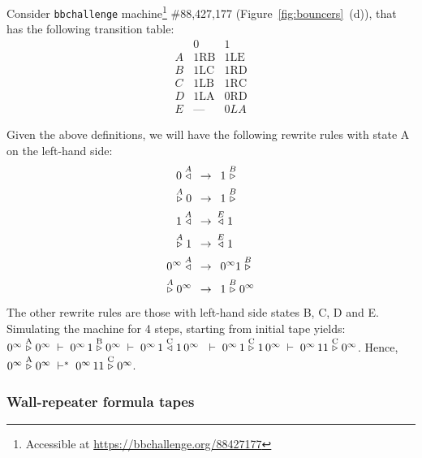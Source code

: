 \begin{example}\label{ex:bouncer88427177}
    Consider \texttt{bbchallenge} machine\footnote{Accessible at \url{https://bbchallenge.org/88427177}} \#88,427,177 (Figure~\ref{fig:bouncers}~(d)), that has the following transition table:
    \[
        \begin{array}{l|ll}
              & 0          & 1          \\
            \hline
            A & 1\text{RB} & 1\text{LE} \\
            B & 1\text{LC} & 1\text{RD} \\
            C & 1\text{LB} & 1\text{RC} \\
            D & 1\text{LA} & 0\text{RD} \\
            E & \mbox{---} & 0LA
        \end{array}
    \]

    Given the above definitions, we will have the following rewrite rules with state A on the left-hand side:
    \begin{align*}
        0 \stackrel{A}\triangleleft\,\,\,        & \to\,\,\, 1 \stackrel{B}\triangleright          \\
        \stackrel{A}\triangleright 0\,\,\,        & \to\,\,\, 1 \stackrel{B}\triangleright          \\
        1 \stackrel{A}\triangleleft\,\,\,        & \to\,\,\, \stackrel{E}\triangleleft 1          \\
        \stackrel{A}\triangleright 1\,\,\,        & \to\,\,\, \stackrel{E}\triangleleft 1          \\
        0^\infty \stackrel{A}\triangleleft\,\,\, & \to\,\,\, 0^\infty 1 \stackrel{B}\triangleright \\
        \stackrel{A}\triangleright 0^\infty\,\,\, & \to\,\,\, 1 \stackrel{B}\triangleright 0^\infty
    \end{align*}
    The other rewrite rules are those with left-hand side states B, C, D and E. Simulating the machine for 4 steps, starting from initial tape yields:
    $ 0^\infty \rhead{\text{A}} 0^\infty \;\vdash\; 0^\infty \, 1 \rhead{\text{B}} 0^\infty \;\vdash\; 0^\infty \, 1 \lhead{\text{C}} 1\, 0^\infty\ \;\vdash\; 0^\infty \, 1 \rhead{\text{C}} 1\, 0^\infty \;\vdash\; 0^\infty \, 1 1 \rhead{\text{C}} 0^\infty$. Hence, $0^\infty \stackrel{\text{A}}\triangleright 0^\infty \;\vdash^*\; 0^\infty \, 1 1 \stackrel{\text{C}}\triangleright 0^\infty$.
\end{example}

\subsubsection{Wall-repeater formula tapes}\label{sec:bouncers:formula-tapes}

